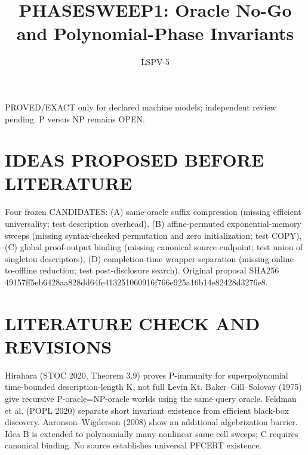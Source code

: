 \documentclass{article}
\title{PHASESWEEP1: Oracle No-Go and Polynomial-Phase Invariants}
\author{LSPV-5}
\begin{document}
\maketitle
\noindent PROVED/EXACT only for declared machine models; independent review pending. P versus NP remains OPEN.
\section{IDEAS PROPOSED BEFORE LITERATURE}
Four frozen CANDIDATES: (A) same-oracle suffix compression (missing efficient universality; test description overhead), (B) affine-permuted exponential-memory sweeps (missing syntax-checked permutation and zero initialization; test COPY), (C) global proof-output binding (missing canonical source endpoint; test union of singleton descriptors), (D) completion-time wrapper separation (missing online-to-offline reduction; test post-disclosure search). Original proposal SHA256 49157ff5eb6428aa828dd64fe413251060916f766e925a16b14e82428d3276e8.
\section{LITERATURE CHECK AND REVISIONS}
Hirahara (STOC 2020, Theorem 3.9) proves P-immunity for superpolynomial time-bounded description-length K, not full Levin Kt. Baker--Gill--Solovay (1975) give recursive P-oracle=NP-oracle worlds using the same query oracle. Feldman et al. (POPL 2020) separate short invariant existence from efficient black-box discovery. Aaronson--Wigderson (2008) show an additional algebrization barrier. Idea B is extended to polynomially many nonlinear same-cell sweeps; C requires canonical binding. No source establishes universal PFCERT existence.
\end{document}
